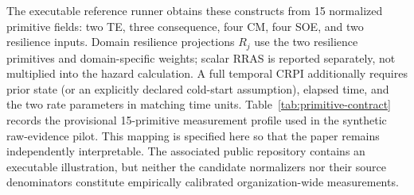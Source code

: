 \documentclass[11pt]{article}
\begin{document}
The executable reference runner obtains these constructs from 15 normalized
primitive fields: two TE, three consequence, four CM, four SOE, and two
resilience inputs. Domain resilience projections $R_j$ use the two resilience
primitives and domain-specific weights; scalar RRAS is reported separately,
not multiplied into the hazard calculation. A full temporal CRPI additionally
requires prior state (or an explicitly declared cold-start assumption), elapsed
time, and the two rate parameters in matching time units. Table~\ref{tab:primitive-contract} records the provisional
15-primitive measurement profile used in the synthetic raw-evidence
pilot. This mapping is specified here so that the paper remains
independently interpretable. The associated public repository
contains an executable illustration, but neither the candidate
normalizers nor their source denominators constitute
empirically calibrated organization-wide measurements.
\end{document}

